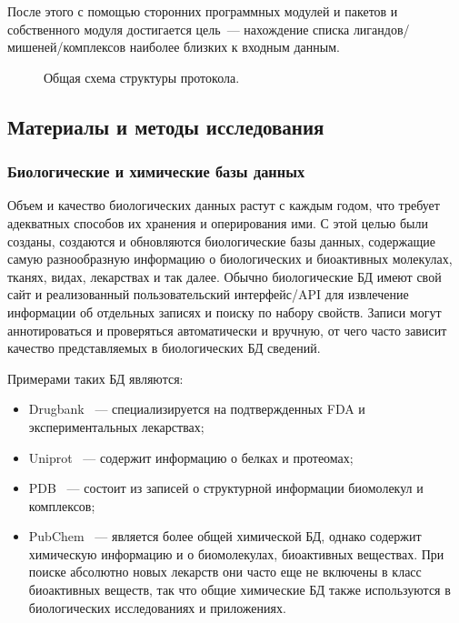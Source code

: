 \documentclass[a4paper,14pt]{article}         %
\begin{document}
После этого с помощью сторонних программных модулей и пакетов и собственного модуля достигается цель~--- нахождение списка лигандов/мишеней/комплексов наиболее близких к входным данным.

\begin{figure}[hp]
		\caption{Общая схема структуры протокола.}
		\label{structure}
\end{figure}

\newpage
\subsection{Материалы и методы исследования}
\subsubsection{Биологические и химические базы данных}
Объем и качество биологических данных растут с каждым годом, что требует адекватных способов их хранения и оперирования ими. С этой целью были созданы, создаются и обновляются биологические базы данных, содержащие самую разнообразную информацию о биологических и биоактивных молекулах, тканях, видах, лекарствах и так далее. Обычно биологические БД имеют свой сайт и реализованный пользовательский интерфейс/API для извлечение информации об отдельных записях и поиску по набору свойств. Записи могут аннотироваться и проверяться автоматически и вручную, от чего часто зависит качество представляемых в биологических БД сведений.

Примерами таких БД являются: 
\begin{itemize}
	\item Drugbank \cite{drugbank}~--- специализируется на подтвержденных FDA и экспериментальных лекарствах; 
	\item Uniprot \cite{uniprot}~--- содержит информацию о белках и протеомах; 
	\item PDB \cite{pdb}~--- состоит из записей о структурной информации биомолекул и комплексов;  
	\item PubChem \cite{pubchem}~--- является более общей химической БД, однако содержит химическую информацию и о биомолекулах, биоактивных веществах. При поиске абсолютно новых лекарств они часто еще не включены в класс биоактивных веществ, так что общие химические БД также используются в биологических исследованиях и приложениях.
\end{itemize}
\end{document}

